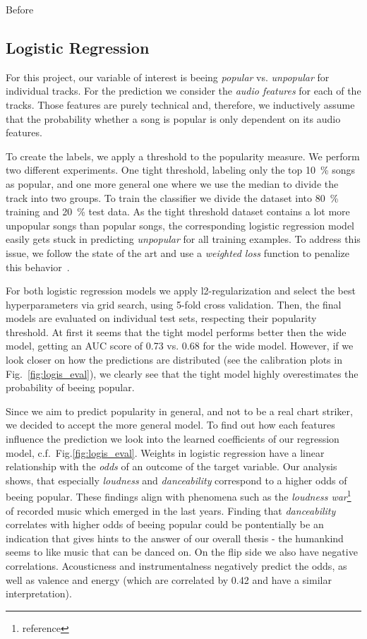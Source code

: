 \documentclass{article}
\begin{document}
Before 

\subsection{Logistic Regression}
For this project, our variable of interest is beeing \textit{popular} vs. \textit{unpopular} for individual tracks.
For the prediction we consider the \textit{audio features} for each of the tracks. 
Those features are purely technical and, therefore, we inductively assume that the probability whether a song is popular is only dependent on its audio features. 

To create the labels, we apply a threshold to the popularity measure. 
We perform two different experiments. 
One tight threshold, labeling only the top \SI{10}{\percent} songs as popular, and one more general one where we use the median to divide the track into two groups.
To train the classifier we divide the dataset into \SI{80}{\percent} training and \SI{20}{\percent} test data.
As the tight threshold dataset contains a lot more unpopular songs than popular songs, the corresponding logistic regression model easily gets stuck in predicting \textit{unpopular} for all training examples. 
To address this issue, we follow the state of the art and use a \textit{weighted loss} function to penalize this behavior~\cite{haixiangLearningClassimbalancedData2017a}.

For both logistic regression models we apply l2-regularization and select the best hyperparameters via grid search, using 5-fold cross validation. Then, the final models are evaluated on individual test sets, respecting their popularity threshold.
At first it seems that the tight model performs better then the wide model, getting an AUC score of \num{0.73} vs. \num{0.68} for the wide model.
%
However, if we look closer on how the predictions are distributed (see the calibration plots in Fig.~\ref{fig:logis_eval}), we clearly see that the tight model highly overestimates the probability of beeing popular.

Since we aim to predict popularity in general, and not to be a real chart striker, we decided to accept the more general model.
To find out how each features influence the prediction we look into the learned coefficients of our regression model, c.f.~Fig.\ref{fig:logis_eval}.
Weights in logistic regression have a linear relationship with the \textit{odds} of an outcome of the target variable.
Our analysis shows, that especially \textit{loudness} and \textit{danceability} correspond to a higher odds of beeing popular.
These findings align with phenomena such as the \textit{loudness war}\footnote{reference} of recorded music which emerged in the last years.
Finding that \textit{danceability} correlates with higher odds of beeing popular could be pontentially be an indication that gives hints to the answer of our overall thesis - the humankind seems to like music that can be danced on.
On the flip side we also have negative correlations. 
Acousticness and instrumentalness negatively predict the odds, as well as valence and energy (which are correlated by 0.42 and have a similar interpretation).
\end{document}
